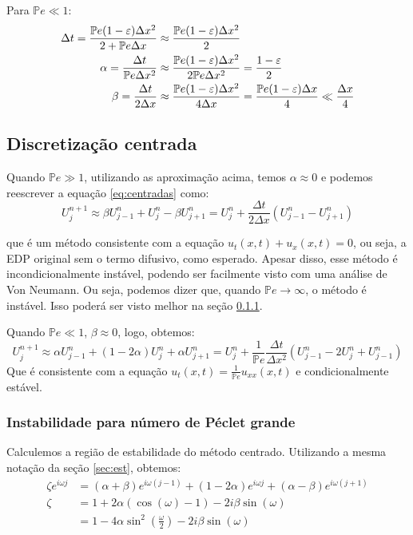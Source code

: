 \documentclass[12pt, a4paper]{article}
\newcommand{\bb}[1]{\mathbb{#1}}
\newcommand{\D}[1]{\Delta#1}
\newcommand{\Pe}{\bb{P}e}
\begin{document}
    Para $\Pe \ll 1$:
    \begin{align}
        \D{t} = \frac{\Pe (1-\varepsilon)\D{x^2}}{2 + \Pe \D{x}} &\approx \frac{\Pe (1-\varepsilon)\D{x^2}}{2} \notag \\
        \alpha = \frac{\D{t}}{\Pe \D{x^2}} &\approx \frac{\Pe (1-\varepsilon)\D{x^2}}{2\Pe \D{x^2}} = \frac{1-\varepsilon}{2} \notag \\
        \beta = \frac{\D{t}}{2 \D{x}} &\approx \frac{\Pe (1-\varepsilon)\D{x^2}}{4\D{x}} = \frac{\Pe(1-\varepsilon)\D{x}}{4} \ll \frac{\D{x}}{4} \notag
    \end{align}

    \subsection{Discretização centrada}
    Quando $\Pe \gg 1$, utilizando as aproximação acima, temos $\alpha \approx 0$ e podemos reescrever a equação \ref{eq:centradas} como:
    \[
        U_j^{n+1} \approx \beta U_{j-1}^n + U_j^n -\beta U_{j+1}^n = U_j^n + \frac{\D{t}}{2\D{x}}(U_{j-1}^n - U_{j+1}^n)
    \]

    que é um método consistente com a equação $u_t(x,t) + u_x(x,t) = 0$, ou seja, a EDP original sem o termo difusivo, como esperado. Apesar disso, esse método é incondicionalmente instável, podendo ser facilmente visto com uma análise de Von Neumann. Ou seja, podemos dizer que, quando $\Pe \to \infty$, o método é instável. Isso poderá ser visto melhor na seção \ref{sec:inst}.

    Quando $\Pe \ll 1$, $\beta \approx 0$, logo, obtemos:
    \[
        U_j^{n+1} \approx \alpha U_{j-1}^n + (1 - 2\alpha) U_{j}^n + \alpha U_{j+1}^n = U_{j}^n + \frac{1}{\Pe}\frac{\D{t}}{\D{x^2}}(U_{j-1}^n - 2 U_{j}^n + U_{j-1}^n)
    \]
    Que é consistente com a equação $u_t(x,t) = \frac{1}{\Pe} u_{xx}(x,t)$ e condicionalmente estável.

    \subsubsection{Instabilidade para número de Péclet grande}
    \label{sec:inst}
    Calculemos a região de estabilidade do método centrado. Utilizando a mesma notação da seção \ref{sec:est}, obtemos:
    \begin{equation}
        \begin{split}
            \zeta e^{i \omega j} &= (\alpha + \beta) e^{i\omega(j-1)} + (1-2\alpha)e^{i \omega j} + (\alpha - \beta)e^{i\omega(j+1)} \\
            \zeta &= 1 + 2\alpha(\cos(\omega) - 1) - 2i\beta\sin(\omega) \\
                  &= 1 - 4\alpha\sin^2\left(\frac{\omega}{2}\right) - 2i\beta\sin(\omega)
        \end{split}
    \end{equation}
\end{document}

